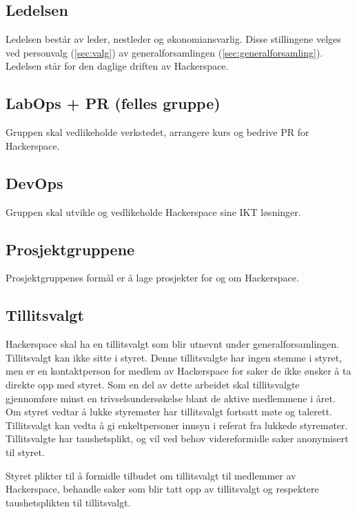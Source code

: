 \subsection{Ledelsen}\label{sec:struktur:ledelsen}
Ledelsen består av leder, nestleder og økonomiansvarlig.
Disse stillingene velges ved personvalg (\ref{sec:valg}) av generalforsamlingen (\ref{sec:generalforsamling}).
Ledelsen står for den daglige driften av Hackerspace.

\subsection{LabOps + PR (felles gruppe)}\label{sec:struktur:labops}
Gruppen skal vedlikeholde verkstedet, arrangere kurs og bedrive PR for Hackerspace.

\subsection{DevOps}\label{sec:struktur:devops}
Gruppen skal utvikle og vedlikeholde Hackerspace sine IKT løsninger.

\subsection{Prosjektgruppene}\label{sec:struktur:prosjektgruppene}
Prosjektgruppenes formål er å lage prosjekter for og om Hackerspace.

\subsection{Tillitsvalgt}\label{sec:struktur:tillitsvalgt}
Hackerspace skal ha en tillitsvalgt som blir utnevnt under generalforsamlingen. Tillitsvalgt kan ikke sitte i styret.
Denne tillitsvalgte har ingen stemme i styret, men er en kontaktperson for medlem av Hackerspace for saker de ikke ønsker å ta direkte opp med styret.
Som en del av dette arbeidet skal tillitsvalgte gjennomføre minst en trivselsundersøkelse blant de aktive medlemmene i året.
Om styret vedtar å lukke styremøter har tillitsvalgt fortsatt møte og talerett.
Tillitsvalgt kan vedta å gi enkeltpersoner innsyn i referat fra lukkede styremøter.
Tillitsvalgte har taushetsplikt, og vil ved behov videreformidle saker anonymisert til styret.

Styret plikter til å formidle tilbudet om tillitsvalgt til medlemmer av Hackerspace, behandle saker som blir tatt opp av tillitsvalgt og respektere taushetsplikten til tillitsvalgt.

